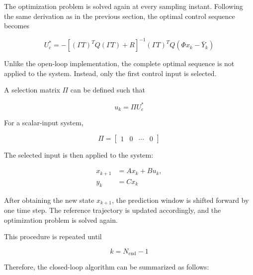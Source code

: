 The optimization problem is solved again at every sampling instant. Following the same derivation as in the previous section, the optimal control sequence becomes

\begin{equation}
    U_c^\ast
    =
    -
    \left[
        (\Gamma T)^T Q (\Gamma T) + R
    \right]^{-1}
    (\Gamma T)^T Q
    \left(
        \Phi x_k-\bar{Y}_k
    \right)
    \label{eq:closed_loop_optimal_u}
\end{equation}

Unlike the open-loop implementation, the complete optimal sequence is not applied to the system. Instead, only the first control input is selected.

A selection matrix \(\Pi\) can be defined such that

\begin{equation}
    u_k = \Pi U_c^\ast
    \label{eq:closed_loop_first_input}
\end{equation}

For a scalar-input system,

\begin{equation}
    \Pi =
    \begin{bmatrix}
        1 & 0 & \cdots & 0
    \end{bmatrix}
\end{equation}

The selected input is then applied to the system:

\begin{align}
    x_{k+1} &= Ax_k + Bu_k, \\
    y_k &= Cx_k
\end{align}

After obtaining the new state \(x_{k+1}\), the prediction window is shifted forward by one time step. The reference trajectory is updated accordingly, and the optimization problem is solved again.

This procedure is repeated until

\begin{equation}
    k = N_{\mathrm{end}}-1
\end{equation}

Therefore, the closed-loop algorithm can be summarized as follows:

